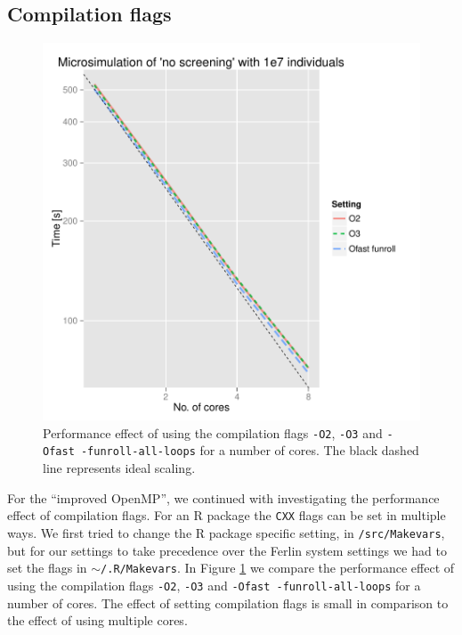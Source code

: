 

\subsection{Compilation flags}

\begin{figure}[!htbp] \centering
  \includegraphics[height=0.5\textheight]{images/flagsProfiling.pdf}
  \caption{Performance effect of using the compilation flags
    \texttt{-O2}, \texttt{-O3} and \texttt{-Ofast -funroll-all-loops}
    for a number of cores. The black dashed line represents ideal
    scaling.}
  \label{fig:flagScaling}
\end{figure}

For the ``improved OpenMP'', we continued with investigating the
performance effect of compilation flags. For an R package the
\texttt{CXX} flags can be set in multiple ways. We first tried to change the R package
specific setting, in \texttt{/src/Makevars}, but for our settings to
take precedence over the Ferlin system settings we had to set the
flags in \texttt{$\sim$/.R/Makevars}. In Figure \ref{fig:flagScaling} we
compare the performance effect of using the compilation flags
\texttt{-O2}, \texttt{-O3} and \texttt{-Ofast -funroll-all-loops} for
a number of cores. The effect of setting compilation flags is small in
comparison to the effect of using multiple cores.

